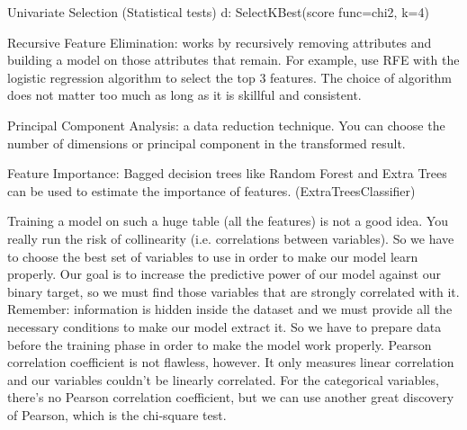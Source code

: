 \documentclass[preprint,12pt]{elsarticle}
\begin{document}


Univariate Selection (Statistical tests) d:  SelectKBest(score func=chi2, k=4)

Recursive Feature Elimination: works by recursively removing attributes and building a model on those attributes that remain. For example, use RFE with the logistic regression algorithm to select the top 3 features. The choice of algorithm does not matter too much as long as it is skillful and consistent.

Principal Component Analysis:  a data reduction technique. You can choose the number of dimensions or principal component in the transformed result.

Feature Importance: Bagged decision trees like Random Forest and Extra Trees can be used to estimate the importance of features. (ExtraTreesClassifier)

Training a model on such a huge table (all the features) is not a good idea. You really run the risk of collinearity (i.e. correlations between variables). So we have to choose the best set of variables to use in order to make our model learn properly.
Our goal is to increase the predictive power of our model against our binary target, so we must find those variables that are strongly correlated with it. Remember: information is hidden inside the dataset and we must provide all the necessary conditions to make our model extract it. So we have to prepare data before the training phase in order to make the model work properly.
Pearson correlation coefficient is not flawless, however. It only measures linear correlation and our variables couldn’t be linearly correlated. For the categorical variables, there’s no Pearson correlation coefficient, but we can use another great discovery of Pearson, which is the chi-square test.
\end{document}
